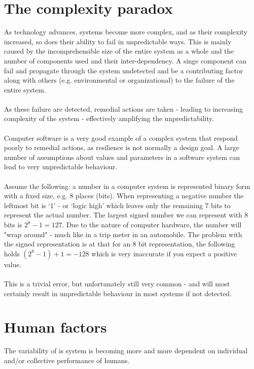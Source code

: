 \section{The complexity paradox}
As technology advances, systems become more complex, and as their complexity increased, so does their ability to fail in unpredictable ways. This is mainly caused by the incomprehensible size of the entire system as a whole and the number of components used and their inter-dependency.
A singe component can fail and propagate through the system undetected and be a contributing factor along with others (e.g. environmental or organizational) to the failure of the entire system.\\
\\
As these failure are detected, remedial actions are taken - leading to increasing complexity of the system - effectively amplifying the unpredictability.\\
\\
Computer software is a very good example of a complex system that respond poorly to remedial actions, as resilience is not normally a design goal. A large number of assumptions about values and parameters in a software system can lead to very unpredictable behaviour.\\
\\
Assume the following: a number in a computer system is represented binary form with a fixed size, e.g. 8 places (bits). When representing a negative number the leftmost bit is `1' - or `logic high' which leaves only the remaining 7 bits to represent the actual number. The largest signed number we can represent with 8 bits is $2^8 - 1 = 127$. Due to the nature of computer hardware, the number will "wrap around" - much like in a trip meter in an automobile. The problem with the signed representation is at that for an 8 bit representation, the following holds $(2^8-1)+1 = -128$ which is very inaccurate if you expect a positive value.\\
\\
This is a trivial error, but unfortunately still very common - and will most certainly result in unpredictable behaviour in most systems if not detected.


\section{Human factors}
The variability of is system is becoming more and more dependent on individual and/or collective performance of humans.

